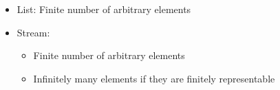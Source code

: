 \begin{itemize}[<+->]
\item List: Finite number of arbitrary elements
\item Stream:
  \begin{itemize}[<+->]
  \item Finite number of arbitrary elements
  \item Infinitely many elements if they are finitely representable
  \end{itemize}
\end{itemize}
